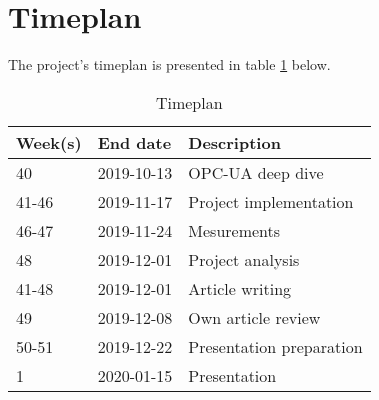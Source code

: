 \section{Timeplan}
The project's timeplan is presented in table \ref{tab:timePlan} below.

\begin{table}[h]
    \centering
    \caption{Timeplan}
    \label{tab:timePlan}
    \begin{tabular}{lll}
    \hline
    \textbf{Week(s)} & \textbf{End date} & \textbf{Description}     \\ \hline
    40               & 2019-10-13        & OPC-UA deep dive         \\ \hline
    41-46            & 2019-11-17        & Project implementation   \\ \hline
    46-47            & 2019-11-24        & Mesurements              \\ \hline
    48               & 2019-12-01        & Project analysis         \\ \hline
    41-48            & 2019-12-01        & Article writing          \\ \hline
    49               & 2019-12-08        & Own article review       \\ \hline
    50-51            & 2019-12-22        & Presentation preparation \\ \hline
    1                & 2020-01-15        & Presentation             \\ \hline
    \end{tabular}
    \end{table}